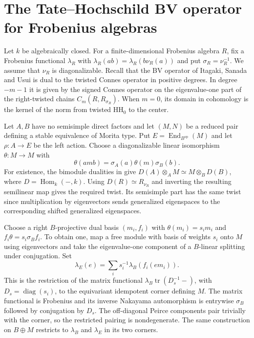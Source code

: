 \documentclass[12pt,a4paper,english,reqno]{amsart}
\numberwithin{equation}{section}
\theoremstyle{plain}
\theoremstyle{definition}
\begin{document}
\section{The Tate--Hochschild BV operator for Frobenius algebras}
\label{sec:tate-bv}

Let $k$ be algebraically closed. For a finite-dimensional Frobenius
algebra $R$, fix a Frobenius functional $\lambda_R$ with
$\lambda_R(ab)=\lambda_R(b\nu_R(a))$ and put $\sigma_R=\nu_R^{-1}$.
We assume that $\nu_R$ is diagonalizable. Recall that the
BV operator of Itagaki, Sanada and Usui
\cite[Theorem~4.5 and Corollary~4.7]{ISUTateBV} is dual to
the twisted Connes operator in positive degrees. In degree
$-m-1$ it is given by the signed Connes operator on the
eigenvalue-one part of the right-twisted chains
$C_m(R,R_{\sigma_R})$. When $m=0$, its domain in cohomology
is the kernel of the norm from twisted $\mathrm{HH}_0$ to
the center.

Let $A,B$ have no semisimple direct factors and let $(M,N)$ be a
reduced pair defining a stable equivalence of Morita type. Put
$E=\operatorname{End}_{B^{\mathrm{op}}}(M)$ and let $\rho:A\to E$
be the left action. Choose a diagonalizable linear isomorphism
$\theta:M\to M$ with
\[
 \theta(amb)=\sigma_A(a)\theta(m)\sigma_B(b).
\]
For existence, the bimodule dualities in
\cite[Lemma~4.1(1)]{CPX2012} give
$D(A)\otimes_A M\simeq M\otimes_B D(B)$, where
$D=\operatorname{Hom}_k(-,k)$. Using $D(R)\simeq R_{\nu_R}$
and inverting the resulting semilinear map gives the required twist.
Its semisimple part has the same twist since multiplication by
eigenvectors sends generalized eigenspaces to the corresponding
shifted generalized eigenspaces.

Choose a right $B$-projective dual basis $(m_i,f_i)$ with
$\theta(m_i)=s_i m_i$ and $f_i\theta=s_i\sigma_B f_i$.
To obtain one, map a free module with basis of weights $s_i$
onto $M$ using eigenvectors and take the eigenvalue-one component
of a $B$-linear splitting under conjugation. Set
\[
 \lambda_E(e)=\sum_i s_i^{-1}\lambda_B(f_i(e m_i)).
\]
This is the restriction of the matrix functional
$\lambda_B\operatorname{tr}(D_s^{-1}-)$, with
$D_s=\operatorname{diag}(s_i)$, to the equivariant idempotent
corner defining $M$. The matrix functional is Frobenius and its
inverse Nakayama automorphism is entrywise $\sigma_B$ followed
by conjugation by $D_s$. The off-diagonal Peirce components
pair trivially with the corner, so the restricted pairing is
nondegenerate. The same construction on $B\oplus M$ restricts
to $\lambda_B$ and $\lambda_E$ in its two corners.
\end{document}
